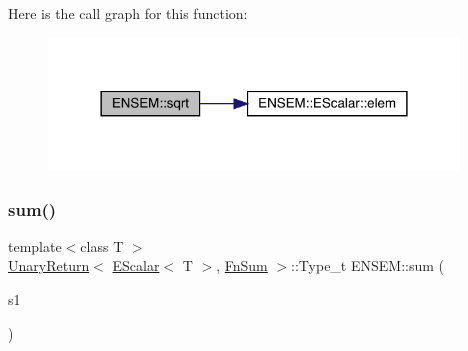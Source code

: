 Here is the call graph for this function\+:
\nopagebreak
\begin{figure}[H]
\begin{center}
\leavevmode
\includegraphics[width=309pt]{d4/dca/group__escalar_ga4e0889a609d84d3ddac113e68bfccfa4_cgraph}
\end{center}
\end{figure}
\mbox{\label{group__escalar_gae544517401e03767c9194bfe3736df37}} 
\subsubsection{\texorpdfstring{sum()}{sum()}}
{\footnotesize\ttfamily template$<$class T $>$ \\
\mbox{\hyperlink{structENSEM_1_1UnaryReturn}{Unary\+Return}}$<$ \mbox{\hyperlink{classENSEM_1_1EScalar}{E\+Scalar}}$<$ T $>$, \mbox{\hyperlink{structENSEM_1_1FnSum}{Fn\+Sum}} $>$\+::Type\+\_\+t E\+N\+S\+E\+M\+::sum (\begin{DoxyParamCaption}\item[{const \mbox{\hyperlink{classENSEM_1_1EScalar}{E\+Scalar}}$<$ T $>$ \&}]{s1 }\end{DoxyParamCaption})\hspace{0.3cm}{\ttfamily [inline]}}

